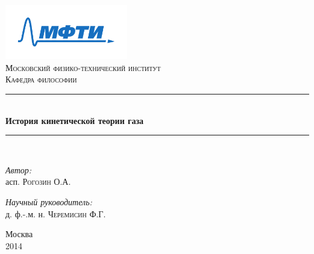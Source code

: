 \begin{titlepage}
\begin{center}

\newcommand{\HRule}{\rule{\linewidth}{0.5mm}}

\includegraphics[width=0.4\textwidth]{mipt_logo}~\\[1cm]
\textsc{\LARGE Московский физико-технический институт}\\[1.5cm]
\textsc{\Large Кафедра философии}\\[0.5cm]

\HRule \\[0.4cm]
{ \huge \bfseries История кинетической теории газа \\[0.4cm] }

\HRule \\[1.5cm]

\begin{minipage}{0.4\textwidth}
\begin{flushleft} \large
\emph{Автор:}\\
асп. \textsc{Рогозин О.А.}
\end{flushleft}
\end{minipage}
\begin{minipage}{0.5\textwidth}
\begin{flushright} \large
\emph{Научный руководитель:} \\
д. ф.-.м. н. \textsc{Черемисин Ф.Г.}
\end{flushright}
\end{minipage}

\vfill

{\large Москва}\\[0.1cm]
{\large 2014}

\end{center}
\end{titlepage}
